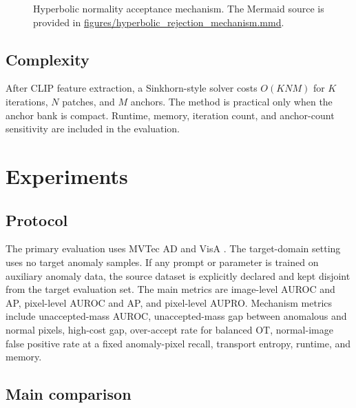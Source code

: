 \documentclass[10pt]{article}
\begin{document}
\begin{figure}[t]
\centering
{}
\caption{Hyperbolic normality acceptance mechanism. The Mermaid source is provided in \url{figures/hyperbolic_rejection_mechanism.mmd}.}
\label{fig:mechanism}
\end{figure}

\subsection{Complexity}

After CLIP feature extraction, a Sinkhorn-style solver costs $O(KNM)$ for $K$ iterations, $N$ patches, and $M$ anchors.
The method is practical only when the anchor bank is compact.
Runtime, memory, iteration count, and anchor-count sensitivity are included in the evaluation.

\section{Experiments}

\subsection{Protocol}

The primary evaluation uses MVTec AD and VisA \cite{bergmann2019mvtec,zou2022visa}.
The target-domain setting uses no target anomaly samples.
If any prompt or parameter is trained on auxiliary anomaly data, the source dataset is explicitly declared and kept disjoint from the target evaluation set.
The main metrics are image-level AUROC and AP, pixel-level AUROC and AP, and pixel-level AUPRO.
Mechanism metrics include unaccepted-mass AUROC, unaccepted-mass gap between anomalous and normal pixels, high-cost gap, over-accept rate for balanced OT, normal-image false positive rate at a fixed anomaly-pixel recall, transport entropy, runtime, and memory.

\subsection{Main comparison}
\end{document}
